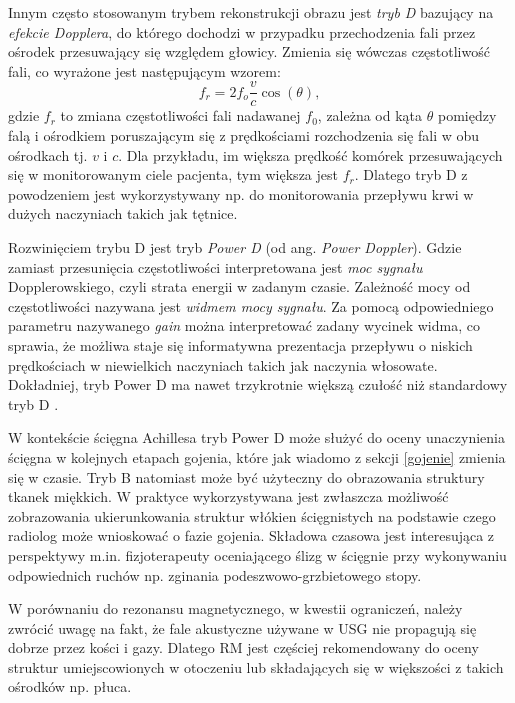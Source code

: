 Innym często stosowanym trybem rekonstrukcji obrazu jest \textit{tryb D} bazujący na \textit{efekcie Dopplera}, do którego dochodzi w przypadku przechodzenia fali przez ośrodek przesuwający się względem głowicy. Zmienia się wówczas częstotliwość fali, co wyrażone jest następującym wzorem:
\begin{equation}
f_r = 2 f_o\frac{v}{c}\cos(\theta),
\end{equation} 
gdzie $f_r$ to zmiana częstotliwości fali nadawanej $f_0$, zależna od kąta $\theta$ pomiędzy falą i ośrodkiem poruszającym się z prędkościami rozchodzenia się fali w obu ośrodkach tj. $v$ i $c$. Dla przykładu, im większa prędkość komórek przesuwających się w monitorowanym ciele pacjenta, tym większa jest $f_r$. Dlatego tryb D z powodzeniem jest wykorzystywany np. do monitorowania przepływu krwi w dużych naczyniach takich jak tętnice.

Rozwinięciem trybu D jest tryb \textit{Power D} (od ang. \textit{Power Doppler}). Gdzie zamiast przesunięcia częstotliwości interpretowana jest \textit{moc sygnału} Dopplerowskiego, czyli strata energii w zadanym czasie. Zależność mocy od częstotliwości nazywana jest \textit{widmem mocy sygnału}. Za pomocą odpowiedniego parametru nazywanego \textit{gain} można interpretować zadany wycinek widma, co sprawia, że możliwa staje się informatywna prezentacja przepływu o niskich prędkościach w niewielkich naczyniach takich jak naczynia włosowate. Dokładniej, tryb Power D ma nawet trzykrotnie większą czułość niż standardowy tryb D \cite{Babcock1996}.

W kontekście ścięgna Achillesa tryb Power D może służyć do oceny unaczynienia ścięgna w kolejnych etapach gojenia, które jak wiadomo z sekcji \ref{gojenie} zmienia się w czasie. Tryb B natomiast może być użyteczny do obrazowania struktury tkanek miękkich. W praktyce wykorzystywana jest zwłaszcza możliwość zobrazowania ukierunkowania struktur włókien ścięgnistych na podstawie czego radiolog może wnioskować o fazie gojenia. Składowa czasowa jest interesująca z perspektywy m.in. fizjoterapeuty oceniającego ślizg w ścięgnie przy wykonywaniu odpowiednich ruchów np. zginania podeszwowo-grzbietowego stopy. 

W porównaniu do rezonansu magnetycznego, w kwestii ograniczeń, należy zwrócić uwagę na fakt, że fale akustyczne używane w USG nie propagują się dobrze przez kości i gazy. Dlatego RM jest częściej rekomendowany do oceny struktur umiejscowionych w otoczeniu lub składających się w większości z takich ośrodków np. płuca. 

